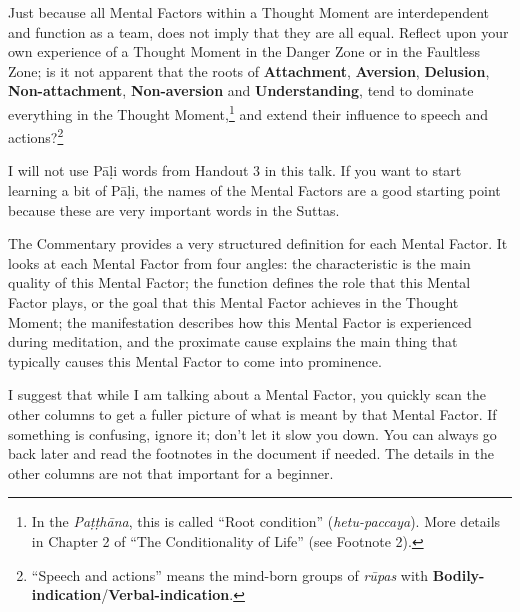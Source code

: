 Just because all Mental Factors within a Thought Moment are interdependent and function as a team, does not imply that they are all equal. Reflect upon your own experience of a Thought Moment in the Danger Zone or in the Faultless Zone; is it not apparent that the roots of \textbf{Attachment}, \textbf{Aversion}, \textbf{Delusion}, \textbf{Non-attachment}, \textbf{Non-aversion} and \textbf{Understanding}, tend to dominate everything in the Thought Moment,\footnote{In the \textit{Paṭṭhāna}, this is called “Root condition” (\textit{hetu-paccaya}). More details in Chapter 2 of “The Conditionality of Life” (see Footnote 2).} and extend their influence to speech and actions?\footnote{“Speech and actions” means the mind-born groups of \textit{rūpas} with \textbf{Bodily-indication}/\textbf{Verbal-indication}.}

I will not use Pāḷi words from Handout 3 in this talk. If you want to start learning a bit of Pāḷi, the names of the Mental Factors are a good starting point because these are very important words in the Suttas.

The Commentary provides a very structured definition for each Mental Factor. It looks at each Mental Factor from four angles: the characteristic is the main quality of this Mental Factor; the function defines the role that this Mental Factor plays, or the goal that this Mental Factor achieves in the Thought Moment; the manifestation describes how this Mental Factor is experienced during meditation, and the proximate cause explains the main thing that typically causes this Mental Factor to come into prominence.

\pagebreak

I suggest that while I am talking about a Mental Factor, you quickly scan the other columns to get a fuller picture of what is meant by that Mental Factor. If something is confusing, ignore it; don’t let it slow you down. You can always go back later and read the footnotes in the document if needed. The details in the other columns are not that important for a beginner.

